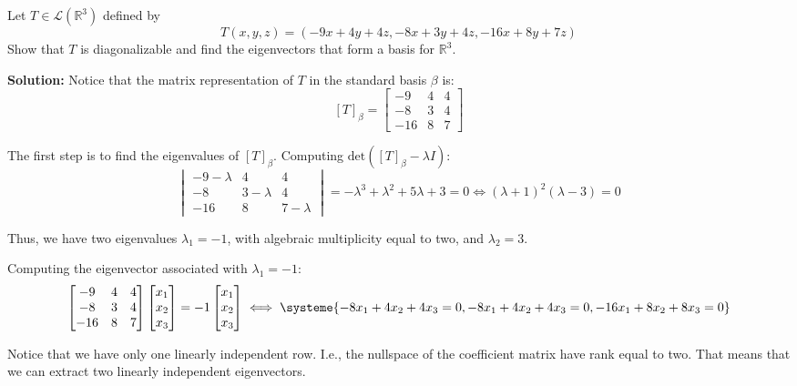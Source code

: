 \begin{example}

	Let $T \in \mathcal{L}(\mathbb{R}^3)$ defined by \[T(x,y,z) = (-9x+4y+4z, -8x+3y+4z, -16x+8y+7z)\] Show that $T$ is diagonalizable and find the eigenvectors that form a basis for $\mathbb{R}^3$.

	\textbf{Solution:} Notice that the matrix representation of $T$ in the standard basis $\beta$ is:
	\[
		[T]_{\beta} = 
		\begin{bmatrix}
		-9 & 4 & 4 \\
		-8 & 3 & 4 \\
		-16 & 8 & 7
		\end{bmatrix}
	\]

	The first step is to find the eigenvalues of $[T]_{\beta}$. Computing $\text{det}([T]_{\beta} - \lambda I)$:
	\[
		\begin{vmatrix}
		-9-\lambda & 4 & 4 \\
		-8 & 3-\lambda & 4 \\
		-16 & 8 & 7-\lambda
		\end{vmatrix}
		= -\lambda^3+\lambda^2+5\lambda+3 = 0 \iff (\lambda+1)^2(\lambda-3) = 0
	\]

	Thus, we have two eigenvalues $\lambda_1 = -1$, with algebraic multiplicity equal to two, and $\lambda_2 = 3$. 

	Computing the eigenvector associated with $\lambda_1 = -1$:
	\[
		\begin{bmatrix}
		-9 & 4 & 4 \\
		-8 & 3 & 4 \\
		-16 & 8 & 7
		\end{bmatrix}
		\begin{bmatrix}
		x_1 \\
		x_2 \\
		x_3 \\
		\end{bmatrix}
		= -1 \begin{bmatrix}
		x_1 \\
		x_2 \\
		x_3 \\
		\end{bmatrix}
		\iff
		\systeme{-8x_1 + 4 x_2 + 4x_3 = 0, -8x_1+4x_2+4x_3 = 0, -16x_1+8x_2+8x_3 = 0}
	\]

	Notice that we have only one linearly independent row. I.e., the nullspace of the coefficient matrix have rank equal to two. That means that we can extract two linearly independent eigenvectors.


\end{example}
